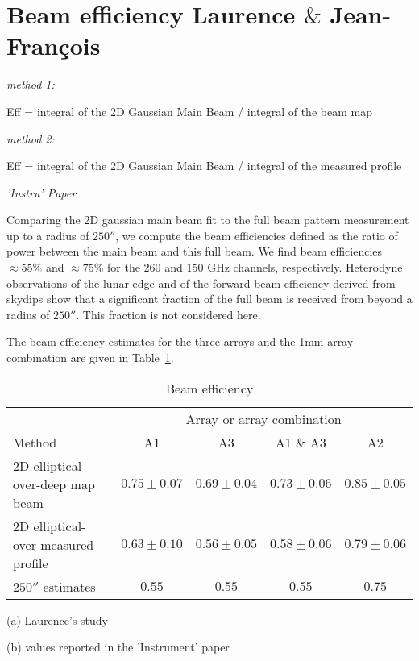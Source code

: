 
\section{Beam efficiency {\color{blue} Laurence $\&$ Jean-Fran\c cois}}

\noindent \emph{method 1:}

Eff = integral of the 2D Gaussian Main Beam / integral of the beam map

\noindent \emph{method 2:}

Eff = integral of the 2D Gaussian Main Beam / integral of the measured profile

\noindent \emph{'Instru' Paper}

Comparing the 2D gaussian main beam fit to the full beam
pattern measurement up to a radius of $250''$, we compute the
beam efficiencies defined as the ratio of power between the main
beam and this full beam. We find beam efficiencies $\approx 55 \%$
and $\approx 75 \%$ for the 260 and 150 GHz channels, respectively.
Heterodyne observations of the lunar edge and of the forward
beam efficiency derived from skydips show that a significant
fraction of the full beam is received from beyond a radius of
$250''$. This fraction is not considered here.


The beam efficiency estimates for the three arrays and the
1mm-array combination are given in Table~\ref{tab:beam_efficiency}.


\begin{table}[h]
  \caption[]{Beam efficiency}
  \centering
  \begin{threeparttable}
  \begin{tabular}{|l|c|c|c|c|}
    \hline
    
       &    \multicolumn{4}{|c|}{Array or array combination} \\
    \cline{2-5}
    Method & A1 &  A3 & A1 $\&$ A3 &  A2  \\
    \hline
    \hline
    2D elliptical-over-deep map beam\tnote{a} &  $0.75 \pm 0.07$  &
    $0.69 \pm 0.04$  &  $0.73 \pm 0.06$  &  $0.85 \pm 0.05$  \\
    2D elliptical-over-measured profile\tnote{a} &  $0.63 \pm 0.10$  &
    $0.56 \pm 0.05$  &  $0.58 \pm 0.06$  &  $0.79 \pm 0.06$  \\
    $250''$ estimates\tnote{b}    &  $0.55$  &   $0.55$ &   $0.55$ &  $0.75$  \\
    \hline
  \end{tabular}
  \begin{tablenotes}
  \item[(a)] Laurence's study
  \item[(b)] values reported in the 'Instrument' paper
  \end{tablenotes}
  \end{threeparttable}
  \label{tab:beam_efficiency}
\end{table}




